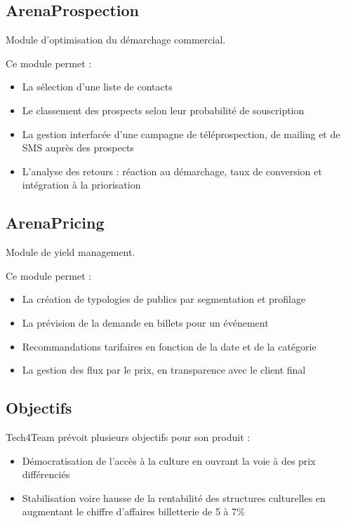 \subsection{ArenaProspection}
Module d’optimisation du démarchage commercial.

Ce module permet :
\begin{itemize}
  \item[\textbullet] La sélection d’une liste de contacts
  \item[\textbullet] Le classement des prospects selon leur probabilité de souscription
  \item[\textbullet] La gestion interfacée d’une campagne de téléprospection, de mailing et de SMS auprès des prospects
  \item[\textbullet] L'analyse des retours : réaction au démarchage, taux de conversion et intégration à la priorisation
\end{itemize}

\subsection{ArenaPricing}
Module de yield management.

Ce module permet :
\begin{itemize}
  \item[\textbullet] La création de typologies de publics par segmentation et profilage
  \item[\textbullet] La prévision de la demande en billets pour un événement
  \item[\textbullet] Recommandations tarifaires en fonction de la date et de la catégorie
  \item[\textbullet] La gestion des flux par le prix, en transparence avec le client final
\end{itemize}

\subsection{Objectifs}
Tech4Team prévoit plusieurs objectifs pour son produit :
\begin{itemize}
	\item[\textbullet] Démocratisation de l'accès à la culture en ouvrant la voie à des prix différenciés
	\item[\textbullet] Stabilisation voire hausse de la rentabilité des structures culturelles en augmentant le chiffre d'affaires billetterie de 5 à 7\%
\end{itemize}

